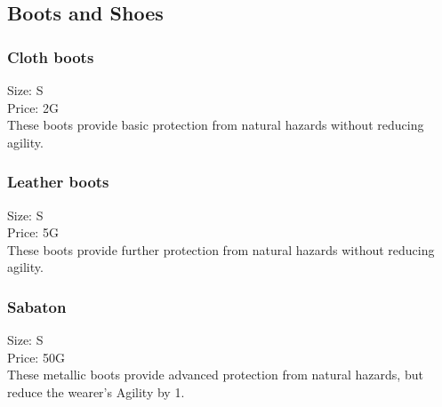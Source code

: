 \subsection{Boots and Shoes}\label{subsec:bootsAndShoes}

\subsubsection{Cloth boots}\label{item:clothboots}
Size: S\\
Price: 2G\\
These boots provide basic protection from natural hazards without reducing agility.

\subsubsection{Leather boots}\label{item:leatherboots}
Size: S\\
Price: 5G\\
These boots provide further protection from natural hazards without reducing agility.

\subsubsection{Sabaton}\label{item:sabaton}
Size: S\\
Price: 50G\\
These metallic boots provide advanced protection from natural hazards, but reduce the wearer's Agility by 1.